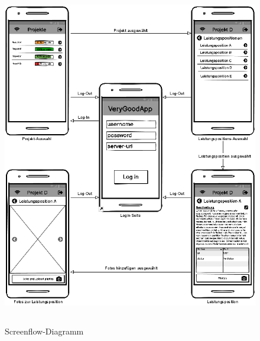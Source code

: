 \begin{figure}[ht]
	\centering
	\includegraphics[width=13cm, height=15cm]{img/mockup-app/Screenflow-App.png}
	\caption{Screenflow-Diagramm}
\end{figure}